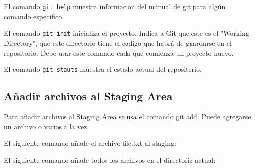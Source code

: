 El comando \texttt{git\ help} muestra información del manual de git para
algún comando específico.

\begin{Shaded}
\begin{Highlighting}[]
    \ExtensionTok{$}
\end{Highlighting}
\end{Shaded}

El comando \texttt{git\ init} inicializa el proyecto. Indica a Git que
este es el "Working Directory", que este directorio tiene el código que
habrá de guardarse en el repositorio. Debe usar este comando cada que
comienza un proyecto nuevo.

\begin{Shaded}
\begin{Highlighting}[]
    \ExtensionTok{$}
\end{Highlighting}
\end{Shaded}

El comando \texttt{git\ stauts} muestra el estado actual del
repositorio.

\begin{Shaded}
\begin{Highlighting}[]
    \ExtensionTok{$}
\end{Highlighting}
\end{Shaded}

\subsection{Añadir archivos al Staging
Area}\label{auxf1adir-archivos-al-staging-area}

Para añadir archivos al Staging Area se usa el comando git add. Puede
agregarse un archivo o varios a la vez.

El siguiente comando añade el archivo file.txt al staging:

\begin{Shaded}
\begin{Highlighting}[]
    \ExtensionTok{$}
\end{Highlighting}
\end{Shaded}

El siguiente comando añade todos los archivos en el directorio actual:

\begin{Shaded}
\begin{Highlighting}[]
    \ExtensionTok{$}
\end{Highlighting}
\end{Shaded}

